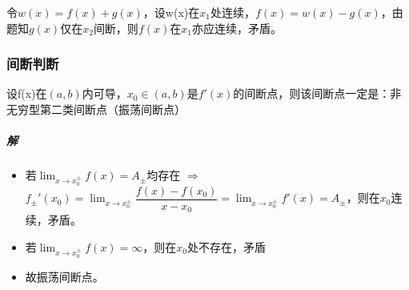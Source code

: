 令\(w(x) = f(x) + g(x)\)，设w(x)在\(x_1\)处连续，\(f(x) = w(x) - g(x)\)，由题知\(g(x)\)仅在\(x_2\)间断，则\(f(x)\)在\(x_1\)亦应连续，矛盾。


\subsubsection{间断判断}
设f(x)在\((a, b)\)内可导，\(x_0 \in (a, b)\)是\(f'(x)\)的间断点，则该间断点一定是：非无穷型第二类间断点（振荡间断点）
\subparagraph{解}
\begin{itemize}
    \item 若\(\displaystyle\lim_{x \to x_0^{\pm}}f(x) = A_{\pm}\)均存在 \(\Rightarrow\) \(f_{\pm}'(x_0) = \displaystyle\lim_{x \to x_0^{\pm}}\dfrac{f(x) - f(x_0)}{x - x_0} = \displaystyle\lim_{x \to x_0^{\pm}}f'(x) = A_{\pm}\)，则在\(x_0\)连续，矛盾。
    \item 若\(\displaystyle\lim_{x \to x_0^{\pm}}f(x) = \infty\)，则在\(x_0\)处不存在，矛盾
    \item 故振荡间断点。
\end{itemize}





